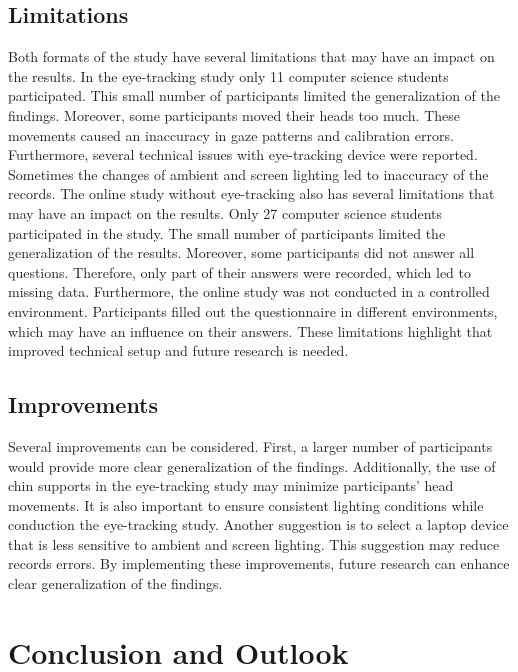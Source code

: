 \section{Limitations} 
Both formats of the study have several limitations that may have an impact on the results.
In the eye-tracking study only 11 computer science students participated.  This small number of participants limited the generalization of the findings.  Moreover, some participants moved their heads too much.  These movements caused an inaccuracy in gaze patterns and calibration errors. Furthermore, several technical issues with eye-tracking device were reported. Sometimes the changes of ambient and screen lighting led to inaccuracy of the records.
The online study without eye-tracking also has several limitations that may have an impact on the results. 
Only 27 computer science students participated in the study. The small number of participants limited the generalization of the results. 
Moreover, some participants did not answer all questions. Therefore, only part of their answers were recorded, which led to missing data. 
Furthermore, the online study was not conducted in a controlled environment. Participants filled out the questionnaire in different environments, which may have an influence on their answers.  
These limitations highlight that improved technical setup and future research is needed. 


\section{Improvements}

Several improvements can be considered. First, a larger number of participants would provide more clear generalization of the findings. Additionally, the use of chin supports in the eye-tracking study may minimize participants’ head movements. It is also important to ensure consistent lighting conditions while conduction the eye-tracking study. Another suggestion is to select a laptop device that is less sensitive to ambient and screen lighting. This suggestion may reduce records errors. By implementing these improvements, future research can enhance clear generalization of the findings. 

\chapter{Conclusion and Outlook}
\label{sec:conclusion}
